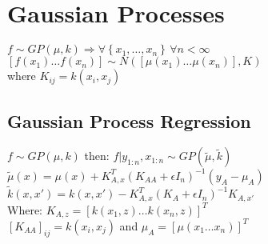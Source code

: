 \section{Gaussian Processes}
$f\sim GP(\mu,k)\Rightarrow\forall \left\{x_1, \dots, x_n\right\} \,\forall n < \infty$\\
$\left[f(x_1)\dots f(x_n)\right]\sim N(\left[\mu(x_1)\dots \mu(x_n)\right], K)$\\ where $K_{ij}=k(x_i,x_j)$
\subsection{Gaussian Process Regression}
$f\sim GP(\mu,k)$ then: $f\vert y_{1:n},x_{1:n} \sim GP(\tilde{\mu},\tilde{k})$\\
$\tilde{\mu}(x) = \mu(x) + K_{A, x}^T{(K_{AA}+\epsilon I_n)}^{-1}\left(y_A-\mu_A\right)$\\
$\tilde{k}(x,x') = k(x,x') - K_{A,x}^T{(K_{A}+\epsilon I_n)}^{-1} K_{A,x'}$\\
Where: $K_{A,z} = {\left[k(x_1,z)\dots k(x_n,z)\right]}^T$\\
${\left[K_{AA}\right]}_{ij} = k(x_i, x_j)$ and $\mu_A = {\left[\mu(x_1 \dots x_n)\right]}^T$



